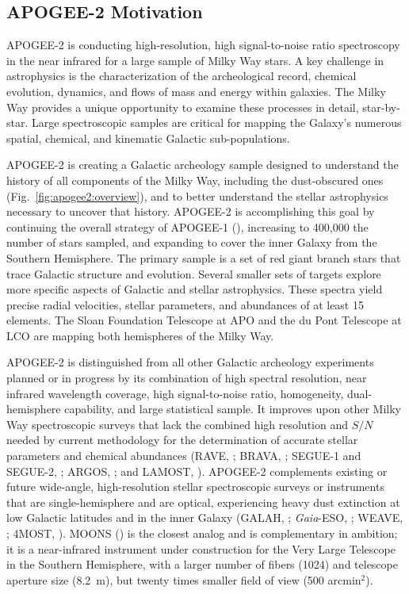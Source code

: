 \subsection{APOGEE-2 Motivation} 

APOGEE-2 is conducting high-resolution, high signal-to-noise ratio
spectroscopy in the near infrared for a large sample of Milky Way
stars.  A key challenge in astrophysics is the characterization of the
archeological record, chemical evolution, dynamics, and flows of mass
and energy within galaxies. The Milky Way provides a unique
opportunity to examine these processes in detail, star-by-star. Large
spectroscopic samples are critical for mapping the Galaxy's numerous
spatial, chemical, and kinematic Galactic sub-populations.

APOGEE-2 is creating a Galactic archeology sample designed to
understand the history of all components of the Milky Way, including
the dust-obscured ones (Fig.~\ref{fig:apogee2:overview}), and to
better understand the stellar astrophysics necessary to uncover that
history. APOGEE-2 is accomplishing this goal by continuing the overall
strategy of APOGEE-1 (\citealt{zasowski13a, majewski15a}), increasing
to 400,000 the number of stars sampled, and expanding to cover the
inner Galaxy from the Southern Hemisphere. The primary sample is a set
of red giant branch stars that trace Galactic structure and
evolution. Several smaller sets of targets explore more specific
aspects of Galactic and stellar astrophysics.  These spectra yield
precise radial velocities, stellar parameters, and abundances of at
least 15 elements. The Sloan Foundation Telescope at APO and the du
Pont Telescope at LCO are mapping both hemispheres of the Milky Way.

APOGEE-2 is distinguished from all other Galactic archeology
experiments planned or in progress by its combination of high spectral
resolution, near infrared wavelength coverage, high signal-to-noise
ratio, homogeneity, dual-hemisphere capability, and large statistical
sample.  It improves upon other Milky Way spectroscopic surveys that
lack the combined high resolution and $S/N$ needed by current
methodology for the determination of accurate stellar parameters and
chemical abundances (RAVE, \citealt{steinmetz06a, kordopatis13a};
BRAVA, \citealt{howard08a}; SEGUE-1 and SEGUE-2, \citealt{yanny09a};
ARGOS, \citealt{freeman13a}; and LAMOST, \citealt{cui12a,
  zhao12a}). APOGEE-2 complements existing or future wide-angle,
high-resolution stellar spectroscopic surveys or instruments that are
single-hemisphere and are optical, experiencing heavy dust extinction
at low Galactic latitudes and in the inner Galaxy (GALAH,
\citealt{zucker12a, desilva15a}; {\it Gaia}-ESO,
\citealt{gilmore12a}; WEAVE, \citealt{dalton14a}; 4MOST,
\citealt{dejong14a}). MOONS (\citealt{cirasuolo14a}) is the closest
analog and is complementary in ambition; it is a near-infrared
instrument under construction for the Very Large Telescope in the
Southern Hemisphere, with a larger number of fibers (1024) and
telescope aperture size (8.2~m), but twenty times smaller
field of view (500 arcmin$^2$).

